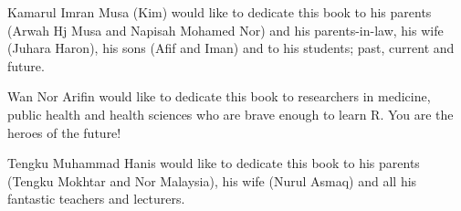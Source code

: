 
\thispagestyle{empty}

\begin{center}

Kamarul Imran Musa (Kim) would like to dedicate this book to his parents (Arwah Hj Musa and Napisah Mohamed Nor) and his parents-in-law, his wife (Juhara Haron), his sons (Afif and Iman) and to his students; past, current and future.

Wan Nor Arifin would like to dedicate this book to researchers in medicine, public health and health sciences who are brave enough to learn R. You are the heroes of the future!

Tengku Muhammad Hanis would like to dedicate this book to his parents (Tengku Mokhtar and Nor Malaysia), his wife (Nurul Asmaq) and all his fantastic teachers and lecturers.

\end{center}

\setlength{\abovedisplayskip}{-5pt}
\setlength{\abovedisplayshortskip}{-5pt}
